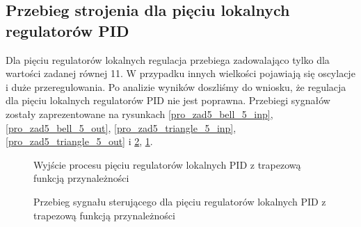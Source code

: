 \subsection{Przebieg strojenia dla pięciu lokalnych regulatorów PID}
Dla pięciu regulatorów lokalnych regulacja przebiega zadowalająco tylko dla wartości zadanej równej 11. W przypadku innych wielkości pojawiają się oscylacje i duże przeregulowania. Po analizie wyników doszliśmy do wniosku, że regulacja dla pięciu lokalnych regulatorów PID nie jest poprawna. Przebiegi sygnałów zostały zaprezentowane na rysunkach \ref{pro_zad5_bell_5_inp}, \ref{pro_zad5_bell_5_out}, \ref{pro_zad5_triangle_5_inp}, \ref{pro_zad5_triangle_5_out} i \ref{pro_zad5_trapezoid_5_inp}, \ref{pro_zad5_trapezoid_5_out}.
\begin{figure}[b]
    \centering
    \caption{Wyjście procesu pięciu regulatorów lokalnych PID z trapezową funkcją przynależności}
    \label{pro_zad5_trapezoid_5_out}
\end{figure}

\begin{figure}[b]
    \centering
    \caption{Przebieg sygnału sterującego dla pięciu regulatorów lokalnych PID z trapezową funkcją przynależności}
    \label{pro_zad5_trapezoid_5_inp}
\end{figure}


